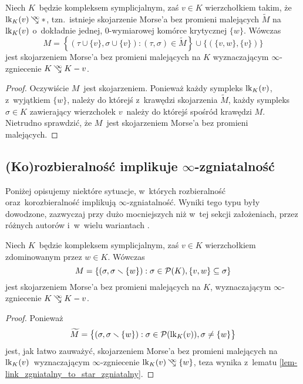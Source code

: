 \begin{lem}\label{lem-link_zgniatalny_to_star_zgniatalny}
Niech $K$~będzie kompleksem symplicjalnym, zaś $v\in K$ wierzchołkiem takim, że $\lk_K(v)\infcoll *$, tzn.~istnieje skojarzenie Morse'a bez promieni malejących $\widetilde{M}$ na $\operatorname{lk}_K(v)$ o~dokładnie jednej, $0$-wymiarowej komórce krytycznej $\{w\}$. Wówczas \[M=\left\{(\tau\cup\{v\},\sigma\cup\{v\}):(\tau,\sigma)\in\widetilde{M}\right\}\cup\bigl\{\left(\{v,w\},\{v\}\right)\bigr\}\] jest skojarzeniem Morse'a bez promieni malejących na $K$ wyznaczającym $\infty$-zgniecenie $K\infcoll K-v$.
\end{lem}
\begin{proof}
Oczywiście $M$~jest skojarzeniem. Ponieważ każdy sympleks $\operatorname{lk}_K(v)$, z~wyjątkiem $\{w\}$, należy do którejś z~krawędzi skojarzenia $\widetilde{M}$, każdy sympleks $\sigma\in K$ zawierający wierzchołek $v$~należy do którejś spośród krawędzi $M$. Nietrudno sprawdzić, że $M$~jest skojarzeniem Morse'a bez promieni malejących.
\end{proof}

\subsection{\texorpdfstring{(Ko)rozbieralność implikuje $\infty$-zgniatalność}{(Ko)rozbieralność implikuje ∞-zgniatalność}}
Poniżej opisujemy niektóre sytuacje, w~których rozbieralność oraz~korozbieralność implikują $\infty$-zgniatalność. Wyniki tego typu były dowodzone, zazwyczaj przy dużo mocniejszych niż w~tej sekcji założeniach, przez różnych autorów i~w~wielu wariantach \cite{Baclawski, Baclawski12,Barmak12,Kozlov06,Kozlov08}. %

\begin{lem}\label{lem-wierzch_zdominowany_to_star_collapsible}
Niech $K$~będzie kompleksem symplicjalnym, zaś $v\in K$ wierzchołkiem zdominowanym przez $w\in K$. Wówczas \[M=\{(\sigma,\sigma\smallsetminus\{w\}):\sigma\in \mathcal{P}(K), \{v,w\}\subseteq\sigma\}\] jest skojarzeniem Morse'a bez promieni malejących na $K$, wyznaczającym $\infty$-zgniecenie $K\infcoll K-v$.
\end{lem}
\begin{proof}
Ponieważ \[\widetilde{M}=\bigl\{(\sigma,\sigma\smallsetminus\{w\}):\sigma\in\mathcal{P}(\operatorname{lk}_K(v)), \sigma\not=\{w\}\bigr\}\] jest, jak łatwo zauważyć, skojarzeniem Morse'a bez promieni malejących na $\operatorname{lk}_K(v)$~wyznaczającym $\infty$-zgniecenie $\lk_K(v)\infcoll \{w\}$, teza wynika z~lematu \ref{lem-link_zgniatalny_to_star_zgniatalny}.
\end{proof}

